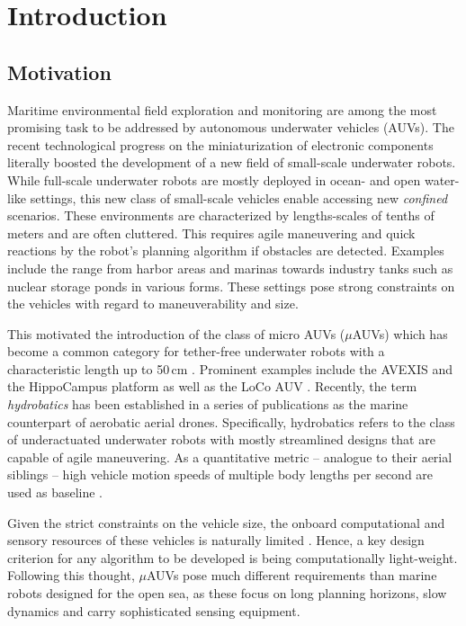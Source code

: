 \chapter{Introduction}\label{chap:introduction}

\section{Motivation}
Maritime environmental field exploration and monitoring are among the most promising task to be addressed by autonomous underwater vehicles (AUVs).
The recent technological progress on the miniaturization of electronic components literally boosted the development of a new field of small-scale underwater robots.
While full-scale underwater robots are mostly deployed in ocean- and open water-like settings, this new class of small-scale vehicles enable accessing new \textit{confined} scenarios.
These environments are characterized by lengths-scales of tenths of meters and are often cluttered. 
This requires agile maneuvering and quick reactions by the robot’s planning algorithm if obstacles are detected.
Examples include the range from harbor areas and marinas towards industry tanks such as nuclear storage ponds in various forms.
These settings pose strong constraints on the vehicles with regard to maneuverability and size.

This motivated the introduction of the class of micro AUVs ($\mu$AUVs) which has become a common category for tether-free underwater robots with a characteristic length up to 50\,cm \cite{micro-auv}.
Prominent examples include the AVEXIS \cite{Griffiths2016} and the HippoCampus platform \cite{duecker2020hippocampusx} as well as the LoCo AUV \cite{Edge2020}.
Recently, the term \textit{hydrobatics} has been established in a series of publications \cite{DueckerEtAl18, Duecker20, duecker2021aerobatics} as the marine counterpart of aerobatic aerial drones.
Specifically, hydrobatics refers to the class of underactuated underwater robots with mostly streamlined designs that are capable of agile maneuvering.
As a quantitative metric  -- analogue to their aerial siblings -- high vehicle motion speeds of multiple body lengths per second are used as baseline \cite{duecker2021aerobatics}.

Given the strict constraints on the vehicle size, the onboard computational and sensory resources of these vehicles is naturally limited \cite{Watson2020}.
Hence, a key design criterion for any algorithm to be developed is being computationally light-weight. 
Following this thought, $\mu$AUVs pose much different requirements than marine robots designed for the open sea, as these focus on long planning horizons, slow dynamics and carry sophisticated sensing equipment.

